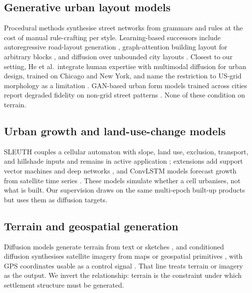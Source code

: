 \documentclass[11pt]{article}
\begin{document}
\subsection{Generative urban layout models}
Procedural methods synthesise street networks from grammars and rules
\citep{parish2001procedural, beirao2010grammar} at the cost of manual
rule-crafting per style. Learning-based successors include
autoregressive road-layout generation \citep{chu2019ntg},
graph-attention building layout for arbitrary blocks
\citep{he2023globalmapper}, and diffusion over unbounded city layouts
\citep{xie2023citygen, xie2025citydreamer}. Closest to our setting, He
et al.\ integrate human expertise with multimodal diffusion for urban
design, trained on Chicago and New York, and name the restriction to
US-grid morphology as a limitation \citep{he2025stepwise}. GAN-based
urban form models trained across cities report degraded fidelity on
non-grid street patterns \citep{jiang2025dcgan}. None of these
condition on terrain.

\subsection{Urban growth and land-use-change models}
SLEUTH couples a cellular automaton with slope, land use, exclusion,
transport, and hillshade inputs \citep{clarke1998sleuth} and remains in
active application \citep{nigeria2024sleuth}; extensions add support
vector machines \citep{rienow2015svm} and deep networks
\citep{chughtai2024casurvey}, and ConvLSTM models forecast growth from
satellite time series \citep{boulila2024convlstm}. These models
simulate whether a cell urbanises, not what is built. Our supervision
draws on the same multi-epoch built-up products \citep{pesaresi2023ghsl}
but uses them as diffusion targets.

\subsection{Terrain and geospatial generation}
Diffusion models generate terrain from text or sketches
\citep{borne2025mesa, hu2023tdn, terrafusion2025}, and conditioned
diffusion synthesises satellite imagery from maps or geospatial
primitives \citep{espinosa2023scotland, wei2026terradit}, with GPS
coordinates usable as a control signal \citep{feng2025gps}. That line
treats terrain or imagery as the output. We invert the relationship:
terrain is the constraint under which settlement structure must be
generated.
\end{document}
